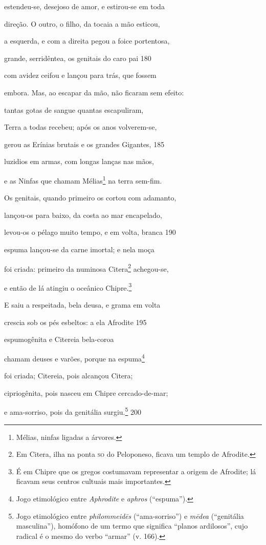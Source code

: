 estendeu-se, desejoso de amor, e estirou-se em toda

direção. O outro, o filho, da tocaia a mão esticou,

a esquerda, e com a direita pegou a foice portentosa,

grande, serridêntea, os genitais do caro pai \num{180}

com avidez ceifou e lançou para trás, que fossem

embora. Mas, ao escapar da mão, não ficaram sem efeito:

tantas gotas de sangue quantas escapuliram,

Terra a todas recebeu; após os anos volverem-se,

gerou as Erínias brutais e os grandes Gigantes, \num{185}

luzidios em armas, com longas lanças nas mãos,

e as Ninfas que chamam Mélias\footnote{Mélias, ninfas ligadas a árvores.} na terra sem-fim.

Os genitais, quando primeiro os cortou com adamanto,

lançou-os para baixo, da costa ao mar encapelado,

levou-os o pélago muito tempo, e em volta, branca \num{190}

espuma lançou-se da carne imortal; e nela moça

foi criada: primeiro da numinosa Citera\footnote{Em Citera, ilha na ponta \textsc{so} do Peloponeso, ficava um templo de Afrodite. } achegou-se,

e então de lá atingiu o oceânico Chipre.\footnote{É em Chipre que os gregos costumavam representar a origem de Afrodite; lá ficavam seus centros cultuais mais importantes.}

E saiu a respeitada, bela deusa, e grama em volta

crescia sob os pés esbeltos: a ela Afrodite \num{195}

espumogênita e Citereia bela-coroa

chamam deuses e varões, porque na espuma\footnote{Jogo etimológico entre \emph{Aphrodite} e \emph{aphros} (``espuma'').}

foi criada; Citereia, pois alcançou Citera;

cipriogênita, pois nasceu em Chipre cercado-de-mar;

e ama-sorriso, pois da genitália surgiu.\footnote{Jogo etimológico entre \emph{philommeidēs} (``ama-sorriso'') e
\emph{mēdea} (``genitália masculina''), homófono de um termo que
significa ``planos ardilosos'', cujo radical é o mesmo do verbo
``armar'' (v. 166).} \num{200}

